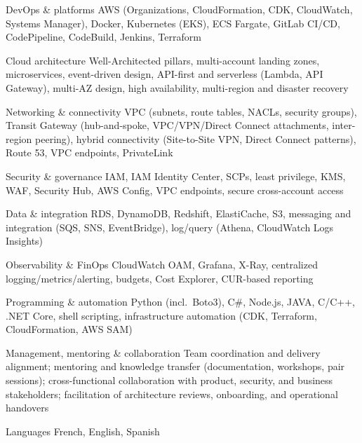 

\begin{cvskills}

  \cvskill
    {DevOps \& platforms}
    {AWS (Organizations, CloudFormation, CDK, CloudWatch, Systems Manager), Docker, Kubernetes (EKS), ECS Fargate, GitLab CI/CD, CodePipeline, CodeBuild, Jenkins, Terraform}

  \cvskill
    {Cloud architecture}
    {Well-Architected pillars, multi-account landing zones, microservices, event-driven design, API-first and serverless (Lambda, API Gateway), multi-AZ design, high availability, multi-region and disaster recovery}

  \cvskill
    {Networking \& connectivity}
    {VPC (subnets, route tables, NACLs, security groups), Transit Gateway (hub-and-spoke, VPC/VPN/Direct Connect attachments, inter-region peering), hybrid connectivity (Site-to-Site VPN, Direct Connect patterns), Route 53, VPC endpoints, PrivateLink}

  \cvskill
    {Security \& governance}
    {IAM, IAM Identity Center, SCPs, least privilege, KMS, WAF, Security Hub, AWS Config, VPC endpoints, secure cross-account access}

  \cvskill
    {Data \& integration}
    {RDS, DynamoDB, Redshift, ElastiCache, S3, messaging and integration (SQS, SNS, EventBridge), log/query (Athena, CloudWatch Logs Insights)}

  \cvskill
    {Observability \& FinOps}
    {CloudWatch OAM, Grafana, X-Ray, centralized logging/metrics/alerting, budgets, Cost Explorer, CUR-based reporting}

  \cvskill
    {Programming \& automation}
    {Python (incl.\ Boto3), C\#, Node.js, JAVA, C/C++, .NET Core, shell scripting, infrastructure automation (CDK, Terraform, CloudFormation, AWS SAM)}

  \cvskill
    {Management, mentoring \& collaboration}
    {Team coordination and delivery alignment; mentoring and knowledge transfer (documentation, workshops, pair sessions); cross-functional collaboration with product, security, and business stakeholders; facilitation of architecture reviews, onboarding, and operational handovers}

  \cvskill
    {Languages}
    {French, English, Spanish}

\end{cvskills}
